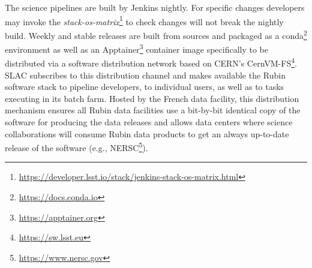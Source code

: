 The science pipelines are built by Jenkins nightly.\cite{2018SPIE10707E..09J}
For specific changes developers may invoke the \emph{stack-os-matrix}\footnote{\url{https://developer.lsst.io/stack/jenkins-stack-os-matrix.html}} to check changes will not break the nightly build. Weekly and stable releases are built from sources and packaged as a conda\footnote{\url{https://docs.conda.io}} environment as well as an Apptainer\footnote{\url{https://apptainer.org}} container image specifically to be distributed via a software distribution network based on CERN's CernVM-FS\footnote{\url{https://sw.lsst.eu}}. SLAC subscribes to this distribution channel and makes available the Rubin software stack to pipeline developers, to individual users, as well as to tasks executing in its batch farm. Hosted by the French data facility, this distribution mechanism ensures all Rubin data facilities use a bit-by-bit identical copy of the software for producing the data releases and allows data centers where science collaborations will consume Rubin data products to get an always up-to-date release of the software (e.g., NERSC\footnote{\url{https://www.nersc.gov}}).

